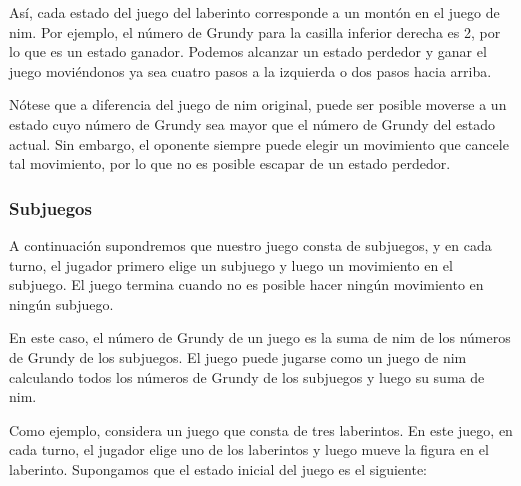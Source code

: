 Así, cada estado del juego del laberinto
corresponde a un montón en el juego de nim.
Por ejemplo, el número de Grundy para
la casilla inferior derecha es 2,
por lo que es un estado ganador.
Podemos alcanzar un estado perdedor y
ganar el juego moviéndonos
ya sea cuatro pasos a la izquierda o
dos pasos hacia arriba.

Nótese que a diferencia del juego de nim original,
puede ser posible moverse a un estado cuyo
número de Grundy sea mayor que el número de Grundy
del estado actual.
Sin embargo, el oponente siempre puede elegir un movimiento
que cancele tal movimiento, por lo que no es posible
escapar de un estado perdedor.

\subsubsection{Subjuegos}

A continuación supondremos que nuestro juego consta
de subjuegos, y en cada turno, el jugador
primero elige un subjuego y luego un movimiento en el subjuego.
El juego termina cuando no es posible hacer ningún movimiento
en ningún subjuego.

En este caso, el número de Grundy de un juego
es la suma de nim de los números de Grundy de los subjuegos.
El juego puede jugarse como un juego de nim calculando
todos los números de Grundy de los subjuegos y luego su suma de nim.

Como ejemplo, considera un juego que consta
de tres laberintos.
En este juego, en cada turno, el jugador elige uno
de los laberintos y luego mueve la figura en el laberinto.
Supongamos que el estado inicial del juego es el siguiente:

